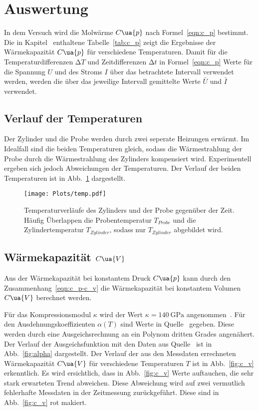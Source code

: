 \section{Auswertung}
\label{sec:auswertung}

In dem Versuch wird die Molwärme $C\ua{p}$ nach Formel~\eqref{eqn:c_p}
bestimmt. Die in Kapitel~\label{sec:wärmekapazität} enthaltene Tabelle~\ref{tab:c_p}
zeigt die Ergebnisse der Wärmekapazität $C\ua{p}$ für verschiedene Temperaturen.
Damit für die Temperaturdifferenzen $\increment T$ und Zeitdifferenzen $\increment t$
in Formel~\eqref{eqn:c_p}
Werte für die Spannung $U$ und des Stroms $I$ über das betrachtete Intervall
verwendet werden,
werden die über das jeweilige Intervall gemittelte Werte $\bar{U}$ und $\bar{I}$
verwendet.

\subsection{Verlauf der Temperaturen}

Der Zylinder und die Probe werden durch zwei seperate Heizungen erwärmt.
Im Idealfall sind die beiden Temperaturen gleich, sodass die Wärmestrahlung der
Probe durch die Wärmestrahlung des Zylinders kompensiert wird. Experimentell ergeben
sich jedoch Abweichungen der Temperaturen.
Der Verlauf der beiden Temperaturen ist in Abb.~\ref{fig:temp}
dargestellt.

\begin{figure}
  \centering
  \texttt{[image: Plots/temp.pdf]}
  \caption{Temperaturverläufe des Zylinders und der Probe gegenüber der Zeit.
  Häufig Überlappen die Probentemperatur $T_{Probe}$ und die Zylindertemperatur $T_{Zylinder}$,
  sodass nur $T_{Zylinder}$ abgebildet wird.}
  \label{fig:temp}
\end{figure}


\subsection{Wärmekapazität $C\ua{V}$}
\label{sec:wärmekapazität}

Aus der Wärmekapazität bei konstantem Druck $C\ua{p}$ kann
durch den Zusammenhang~\eqref{eqn:c_p-c_v} die Wärmekapazität bei
konstantem Volumen $C\ua{V}$ berechnet werden.

Für das Kompressionsmodul $\kappa$ wird der Wert $\kappa = \SI{140}{\giga\pascal}$
angenommen~\cite{kompression}.
Für den Ausdehnungskoeffizienten $\alpha(T)$ sind Werte in Quelle~\cite{anleitung}
gegeben. Diese werden durch eine Ausgeichsrechnung an ein Polynom dritten Grades
angenähert. Der Verlauf der Ausgeichsfunktion mit den Daten aus Quelle~\cite{anleitung}
ist in Abb.~\ref{fig:alpha} dargestellt.
Der Verlauf der aus den Messdaten errechneten Wärmekapazität $C\ua{V}$
für verschiedene Temperaturen $T$ ist in Abb.~\ref{fig:c_v} erkenntlich.
Es wird ersichtlich, dass in Abb.~\ref{fig:c_v} Werte auftauchen, die sehr
stark erwarteten Trend abweichen.
Diese Abweichung wird auf zwei vermutlich fehlerhafte Messdaten in der Zeitmessung zurückgeführt.
Diese sind in Abb.~\ref{fig:c_v} rot makiert.

